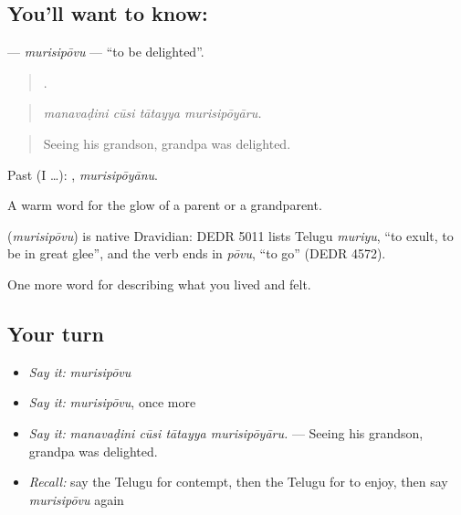 \subsection*{You'll want to know: }
\textbf{} — \emph{murisipōvu} — \textquotedblleft{}to be delighted\textquotedblright{}.

\begin{quote}
   .
\end{quote}

\begin{quote}
\emph{manavaḍini cūsi tātayya murisipōyāru.}
\end{quote}

\begin{quote}
Seeing his grandson, grandpa was delighted.
\end{quote}

Past (I …): , \emph{murisipōyānu}.

A warm word for the glow of a parent or a grandparent.

\begin{cousinweb}
\textbf{} (\emph{murisipōvu}) is native Dravidian: DEDR 5011 lists Telugu \emph{muriyu}, \textquotedblleft{}to exult, to be in great glee\textquotedblright{}, and the verb ends in \emph{pōvu}, \textquotedblleft{}to go\textquotedblright{} (DEDR 4572).
\end{cousinweb}

\begin{grammarlens}[title={What you've built}]
One more word for describing what you lived and felt.
\end{grammarlens}

\subsection*{Your turn}
\begin{itemize}
\raggedright
  \item \emph{Say it:} \emph{murisipōvu}
  \item \emph{Say it:} \emph{murisipōvu}, once more
  \item \emph{Say it:} \emph{manavaḍini cūsi tātayya murisipōyāru.} — Seeing his grandson, grandpa was delighted.
  \item \emph{Recall:} say the Telugu for contempt, then the Telugu for to enjoy, then say \emph{murisipōvu} again
\end{itemize}

